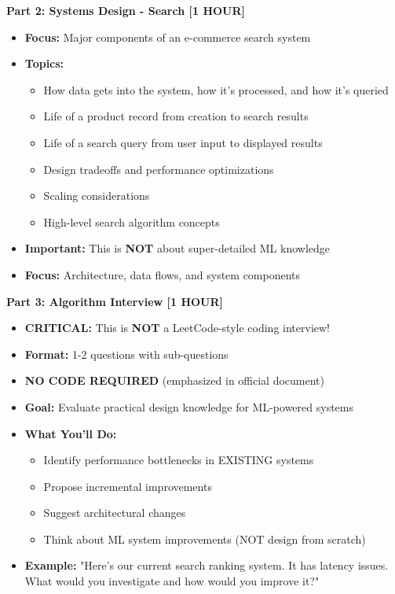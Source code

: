 \documentclass[11pt,letterpaper]{article}
\begin{document}
\textbf{Part 2: Systems Design - Search [1 HOUR]}
\begin{itemize}
    \item \textbf{Focus:} Major components of an e-commerce search system
    \item \textbf{Topics:}
    \begin{itemize}
        \item How data gets into the system, how it's processed, and how it's queried
        \item Life of a product record from creation to search results
        \item Life of a search query from user input to displayed results
        \item Design tradeoffs and performance optimizations
        \item Scaling considerations
        \item High-level search algorithm concepts
    \end{itemize}
    \item \textbf{Important:} This is \textbf{NOT} about super-detailed ML knowledge
    \item \textbf{Focus:} Architecture, data flows, and system components
\end{itemize}

\textbf{Part 3: Algorithm Interview [1 HOUR]}
\begin{itemize}
    \item \textbf{CRITICAL:} This is \textbf{NOT} a LeetCode-style coding interview!
    \item \textbf{Format:} 1-2 questions with sub-questions
    \item \textbf{NO CODE REQUIRED} (emphasized in official document)
    \item \textbf{Goal:} Evaluate practical design knowledge for ML-powered systems
    \item \textbf{What You'll Do:}
    \begin{itemize}
        \item Identify performance bottlenecks in EXISTING systems
        \item Propose incremental improvements
        \item Suggest architectural changes
        \item Think about ML system improvements (NOT design from scratch)
    \end{itemize}
    \item \textbf{Example:} "Here's our current search ranking system. It has latency issues. What would you investigate and how would you improve it?"
\end{itemize}
\end{document}

